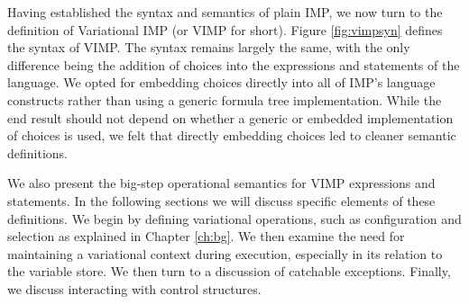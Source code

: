 \documentclass[12pt,oneside]{book}
\newcommand{\tagtree}[3]{#1 \langle #2, #3 \rangle}
\begin{document}
Having established the syntax and semantics of plain IMP, we now turn to the definition of Variational IMP (or VIMP for short).
Figure \ref{fig:vimpsyn} defines the syntax of VIMP. The syntax remains largely the same, with the only difference being the
addition of choices into the expressions and statements of the language. We opted for embedding choices directly into all of IMP's language constructs rather than using
a generic formula tree implementation. While the end result should not depend on whether a generic or embedded implementation of choices is
used, we felt that directly embedding choices led to cleaner semantic definitions.


We also present the big-step operational semantics for VIMP expressions and statements. In the following sections we will discuss specific elements of these definitions.
We begin by defining variational operations, such as configuration and selection as explained in Chapter \ref{ch:bg}. We then examine the need for maintaining a variational context during execution, especially in its relation to the variable store. We then turn to a discussion of
catchable exceptions. Finally, we discuss interacting with control structures.


\def \BigVNum {\infer [VA-Num] { } {(C,S,n) \Downarrow_{VA} n}}
\def \BigVRef {\infer [VA-Ref] { } {(C,S,x) \Downarrow_{VA} S(C,x)}}
\def \BigVAdd {\infer [VA-Add] {(C,S,e) \Downarrow_{VA} u \\ (C,S,e') \Downarrow_{VA} u'} {(C,S,e+e') \Downarrow_{VA} \mathit{liftA2}(+,u,u')}}
\def \BigVAChcOne {\infer [VA-Chc1] {\mathit{sat}(C \wedge C') \\ \mathit{sat}(C \wedge \neg C') \\ (C \wedge C',S,a) \Downarrow_{VA} u \\ (C \wedge \neg C',S,a') \Downarrow_{VA} u'} {(C,S,\tagtree{C'}{a}{a'}) \Downarrow_{VA} \tagtree{C'}{u}{u'}}}
\def \BigVAChcTwo {\infer [VA-Chc2] {\mathit{unsat}(C \wedge C') \\ \mathit{sat}(C \wedge \neg C') \\ (C \wedge \neg C',S,a') \Downarrow_{VA} u} {(C,S,\tagtree{A}{a}{a'}) \Downarrow_{VA} u}}
\def \BigVAChcThree {\infer [VA-Chc3] {\mathit{sat}(C \wedge C') \\ \mathit{unsat}(C \wedge \neg C') \\ (C \wedge C',S,a) \Downarrow_{VA} u} {(C,S,\tagtree{C'}{a}{a'}) \Downarrow_{VA} u}}
\end{document}

